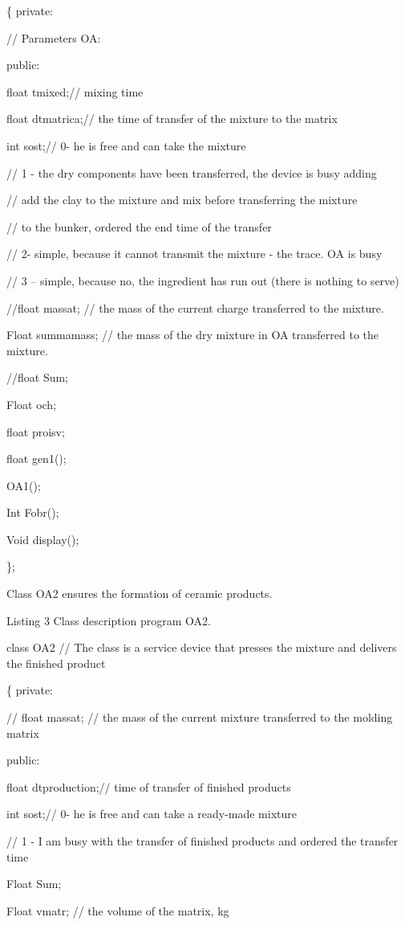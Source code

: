 \{ private:

// Parameters OA:

public:

float tmixed;// mixing time

float dtmatrica;// the time of transfer of the mixture to the matrix

int sost;// 0- he is free and can take the mixture

// 1 - the dry components have been transferred, the device is busy
adding

// add the clay to the mixture and mix before transferring the mixture

// to the bunker, ordered the end time of the transfer

// 2- simple, because it cannot transmit the mixture - the trace. OA is
busy

// 3 -- simple, because no, the ingredient has run out (there is nothing
to serve)

//float massat; // the mass of the current charge transferred to the
mixture.

Float summamass; // the mass of the dry mixture in OA transferred to the
mixture.

//float Sum;

Float och;

float proisv;

float gen1();

OA1();

Int Fobr();

Void display();

\};

Class OA2 ensures the formation of ceramic products.

Listing 3 Class description program OA2.

class OA2 // The class is a service device that presses the mixture and
delivers the finished product

\{ private:

// float massat; // the mass of the current mixture transferred to the
molding matrix

public:

float dtproduction;// time of transfer of finished products

int sost;// 0- he is free and can take a ready-made mixture

// 1 - I am busy with the transfer of finished products and ordered the
transfer time

Float Sum;

Float vmatr; // the volume of the matrix, kg

